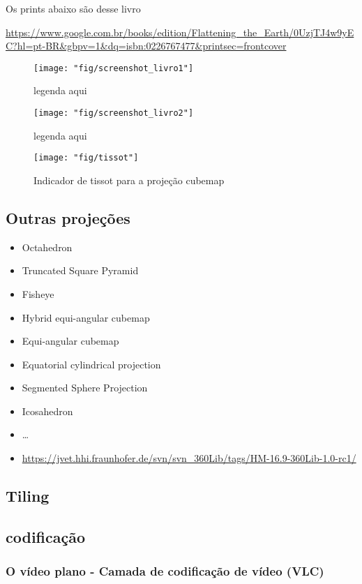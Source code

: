 Os prints abaixo são desse livro

\url{https://www.google.com.br/books/edition/Flattening_the_Earth/0UzjTJ4w9yEC?hl=pt-BR&gbpv=1&dq=isbn:0226767477&printsec=frontcover}

\begin{figure}[tbh]
	\centering
	\texttt{[image: "fig/screenshot\_livro1"]}
	\caption{legenda aqui}
	\label{fig:screenshot_livro1}
\end{figure}

\begin{figure}[tbh]
	\centering
	\texttt{[image: "fig/screenshot\_livro2"]}
	\caption{legenda aqui}
	\label{fig:screenshot_livro2}
\end{figure}

\begin{figure}[tbh]
	\centering
	\texttt{[image: "fig/tissot"]}
	\caption{Indicador de tissot para a projeção cubemap}
	\label{fig:tissot}
\end{figure}

\subsection{Outras projeções}

\begin{itemize}
	\item Octahedron
	\item Truncated Square Pyramid
	\item Fisheye   
	\item Hybrid equi-angular cubemap 	
	\item Equi-angular cubemap
	\item Equatorial cylindrical projection 	
	\item Segmented Sphere Projection 	
	\item Icosahedron 
	\item …
	\item \url{https://jvet.hhi.fraunhofer.de/svn/svn_360Lib/tags/HM-16.9-360Lib-1.0-rc1/}	
\end{itemize}

\subsection{Tiling}
\subsection{codificação}
\subsubsection{O vídeo plano - Camada de codificação de vídeo (VLC)}

